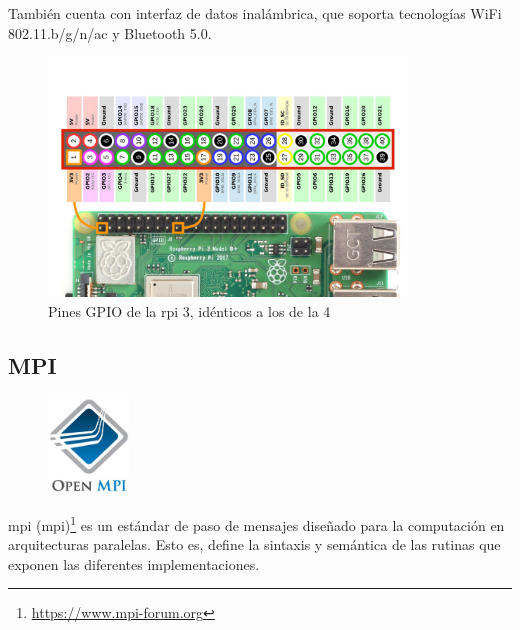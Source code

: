 También cuenta con interfaz de datos inalámbrica, que soporta tecnologías WiFi 802.11.b/g/n/ac y Bluetooth 5.0.

\begin{figure}[h!]
  \centering
  \includegraphics[width=0.85\textwidth]{img/rpi_parts/rpi_gpio.png}
  \caption{Pines GPIO de la \acrlong{rpi} 3, idénticos a los de la 4}
  \label{fig:rpi_gpio_pinout}
\end{figure}

\subsection{MPI}
\begin{figure}
  \centering
  \includegraphics[width=0.19\textwidth]{img/ompi_logo_2.png}
  \label{fig:ompi_logo}
\end{figure} 

\acrshort{mpi} (\acrlong{mpi})\footnote{\url{https://www.mpi-forum.org}} es un estándar de paso de mensajes diseñado para la computación en arquitecturas paralelas. Esto es, define la sintaxis y semántica de las rutinas que exponen las diferentes implementaciones.

